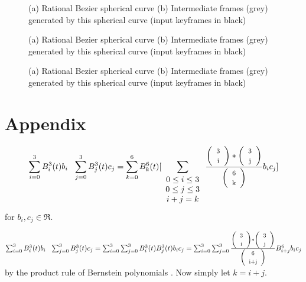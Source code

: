 %

% 


\begin{figure}[h]
\vspace{5.5in}
\caption{(a) Rational Bezier spherical curve
(b) Intermediate frames (grey) generated by this spherical curve
	(input keyframes in black)}
\label{fig:curve1}
\end{figure}

\clearpage

\begin{figure}
\vspace{6in}
\caption{(a) Rational Bezier spherical curve 
(b) Intermediate frames (grey) generated by this spherical curve
	(input keyframes in black)}
\label{fig:curve2}
\end{figure}

\clearpage

\begin{figure}
\vspace{6in}
\caption{(a) Rational Bezier spherical curve 
(b) Intermediate frames (grey) generated by this spherical curve
	(input keyframes in black)}
\label{fig:curve3}
\end{figure}

\clearpage

\ifFull %
\section{Appendix}

\begin{lemma}
\label{lem:product}
\begin{equation}
\sum_{i=0}^{3} B_i^3(t) b_i \ \ \sum_{j=0}^{3} B_j^3(t) c_j
= \sum_{k=0}^{6} B_k^6(t) [\sum_{\begin{array}{c} 0 \leq i \leq 3 \\ 
			     0 \leq j \leq 3 \\ 
			     i+j=k
			     \end{array}}
	\frac{\left( \begin{array}{c} \mbox{\footnotesize{3}} \\ \mbox{\footnotesize{i}} \end{array} \right) * \left( \begin{array}{c} \mbox{\footnotesize{3}} \\ \mbox{\footnotesize{j}} \end{array} \right)}{\left( \begin{array}{c} \mbox{\footnotesize{6}} \\ \mbox{\footnotesize{k}} \end{array} \right)}  b_i c_j ]
\end{equation}
for $b_i,c_j \in \Re$.
\end{lemma}
\prf
$\sum_{i=0}^{3} B_i^3(t) b_i \ \ \sum_{j=0}^{3} B_j^3(t) c_j
= \sum_{i=0}^{3} \sum_{j=0}^{3} B_i^3(t) B_j^3(t) b_i c_j
= \sum_{i=0}^{3} \sum_{j=0}^{3} 
	\frac{\choice{3}{i}*\choice{3}{j}}{\choice{6}{i+j}}
	B_{i+j}^6 b_i c_j$
by the product rule of Bernstein polynomials \cite{farin93}.
Now simply let $k=i+j$.
\QED
\fi %

